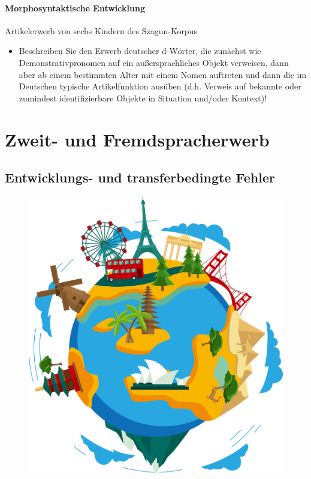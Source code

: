 \documentclass[
  letterpaper,
]{scrbook}
\providecommand{\tightlist}{%
  \setlength{\itemsep}{0pt}\setlength{\parskip}{0pt}}\usepackage{longtable,booktabs,array}
\begin{document}
\hypertarget{morphosyntaktische-entwicklung}{%
\subsection{Morphosyntaktische
Entwicklung}\label{morphosyntaktische-entwicklung}}

Artikelerwerb von sechs Kindern des Szagun-Korpus

\begin{itemize}
\tightlist
\item
  Beschreiben Sie den Erwerb deutscher d-Wörter, die zunächst wie
  Demonstrativpronomen auf ein außersprachliches Objekt verweisen, dann
  aber ab einem bestimmten Alter mit einem Nomen auftreten und dann die
  im Deutschen typische Artikelfunktion ausüben (d.h. Verweis auf
  bekannte oder zumindest identifizierbare Objekte in Situation und/oder
  Kontext)!
\end{itemize}

\part{Zweit- und Fremdspracherwerb}

\hypertarget{sec-gender}{%
\chapter{Entwicklungs- und transferbedingte Fehler}\label{sec-gender}}

\begin{figure}

{\centering 

\href{https://www.clipartmax.com/middle/m2i8K9H7K9H7G6b1_earth-clip-art-world-travel-clipart-png/}{\includegraphics[width=1\textwidth,height=\textheight]{./pictures/clipart66213.png}}

}

\end{figure}
\end{document}
